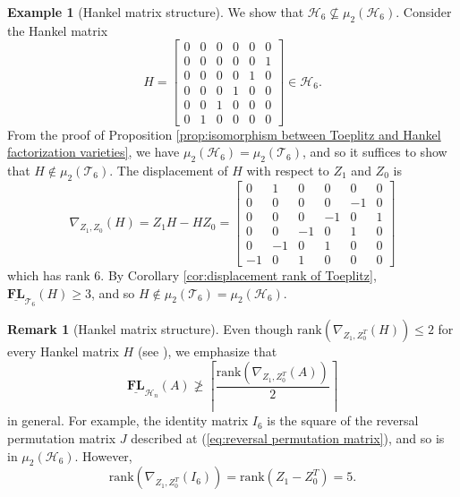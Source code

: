 \documentclass[reqno]{amsart}
\theoremstyle{definition}
\newtheorem{example}[theorem]{Example}
\newtheorem{remark}[theorem]{Remark}
\newcommand{\rank}{\mathrm{rank}}
\numberwithin{equation}{section}
\begin{document}
\begin{example}[Hankel matrix structure]\label{ex:defining equations for Hankel matrix structure}
    We show that $\mathcal{H}_6 \nsubseteq \mu_2(\mathcal{H}_6)$. Consider the Hankel matrix
    \begin{equation*}
        H=\begin{bmatrix}
            0 & 0 & 0 & 0 & 0 & 0\\
            0 & 0 & 0 & 0 & 0 & 1\\
            0 & 0 & 0 & 0 & 1 & 0\\
            0 & 0 & 0 & 1 & 0 & 0\\
            0 & 0 & 1 & 0 & 0 & 0\\
            0 & 1 & 0 & 0 & 0 & 0
        \end{bmatrix} \in \mathcal{H}_6.
    \end{equation*}
    From the proof of Proposition \ref{prop:isomorphism between Toeplitz and Hankel factorization varieties}, we have $\mu_2(\mathcal{H}_6)=\mu_2(\mathcal{T}_6)$, and so it suffices to show that $H \notin \mu_2(\mathcal{T}_6)$. The displacement of $H$  with respect to $Z_1$ and $Z_0$ is 
    \begin{equation*}
        \nabla_{Z_1,Z_0}(H)=Z_1H-HZ_0=\begin{bmatrix}
            0 & 1 & 0 & 0 & 0 & 0\\
            0 & 0 & 0 & 0 & -1 & 0\\
            0 & 0 & 0 & -1 & 0 & 1\\
            0 & 0 & -1 & 0 & 1 & 0\\
            0 & -1 & 0 & 1 & 0 & 0\\
            -1 & 0 & 1 & 0 & 0 & 0
        \end{bmatrix}
    \end{equation*}
    which has rank $6$. By Corollary \ref{cor:displacement rank of Toeplitz}, $\underline{\mathbf{FL}}_{\mathcal{T}_6}(H) \geq 3$, and so $H \notin \mu_2(\mathcal{T}_6)=\mu_2(\mathcal{H}_6)$.
\end{example}

\begin{remark}[Hankel matrix structure]
    Even though $\rank(\nabla_{Z_1,Z_0^T}(H))\leq 2$ for every Hankel matrix $H$ (see \cite[Example 1.3.3]{MR1843842}), we emphasize that
    \begin{equation*}
        \underline{\mathbf{FL}}_{\mathcal{H}_n}(A) \ngeq \left\lceil \frac{\rank(\nabla_{Z_1,Z_0^T}(A))}{2} \right\rceil
    \end{equation*}
    in general. For example, the identity matrix $I_6$ is the square of the reversal permutation matrix $J$ described at (\ref{eq:reversal permutation matrix}), and so is in $\mu_2(\mathcal{H}_6)$. However,
    \begin{equation*}
        \rank(\nabla_{Z_1,Z_0^T}(I_6))=\rank(Z_1-Z_0^T)=5.
    \end{equation*}
\end{remark}
\end{document}
